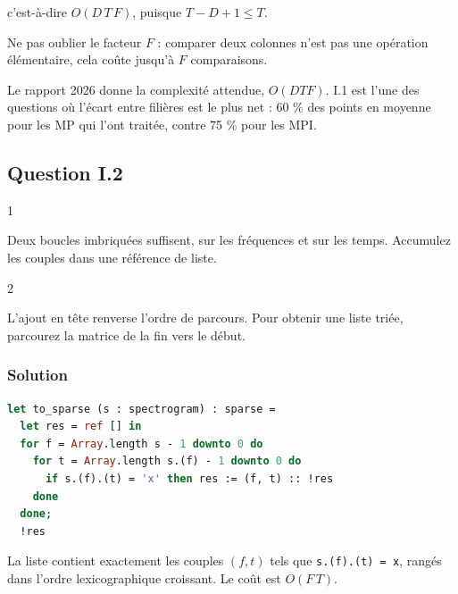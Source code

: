 \documentclass[11pt,a4paper]{article}
\begin{document}
c'est-à-dire \(O(D\,T\,F)\), puisque \(T-D+1\le T\).

\begin{piege}

Ne pas oublier le facteur \(F\) : comparer deux colonnes n'est pas une opération élémentaire, cela coûte jusqu'à \(F\) comparaisons.

\end{piege}

\begin{jury}

Le rapport 2026 donne la complexité attendue, \(O(DTF)\). I.1 est l'une des questions où l'écart entre filières est le plus net : 60 \% des points en moyenne pour les MP qui l'ont traitée, contre 75 \% pour les MPI.

\end{jury}

\hypertarget{question-i.2}{%
\subsection{Question I.2}\label{question-i.2}}

\begin{indication}{1}

Deux boucles imbriquées suffisent, sur les fréquences et sur les temps. Accumulez les couples dans une référence de liste.

\end{indication}

\begin{indication}{2}

L'ajout en tête renverse l'ordre de parcours. Pour obtenir une liste triée, parcourez la matrice de la fin vers le début.

\end{indication}

\hypertarget{solution-1}{%
\subsubsection{Solution}\label{solution-1}}

\begin{lstlisting}[language=Caml]
let to_sparse (s : spectrogram) : sparse =
  let res = ref [] in
  for f = Array.length s - 1 downto 0 do
    for t = Array.length s.(f) - 1 downto 0 do
      if s.(f).(t) = 'x' then res := (f, t) :: !res
    done
  done;
  !res
\end{lstlisting}

La liste contient exactement les couples \((f,t)\) tels que \texttt{s.(f).(t)\ =\ \textquotesingle{}x\textquotesingle{}}, rangés dans l'ordre lexicographique croissant. Le coût est \(O(F\,T)\).
\end{document}
